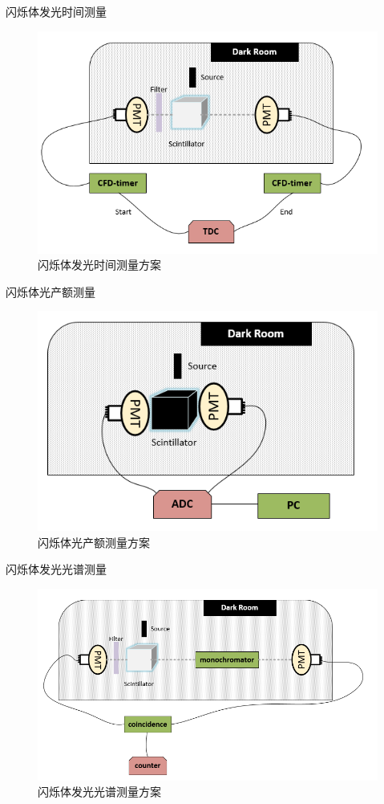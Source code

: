 \documentclass[11pt,compress,xcolor=x11names,UTF8]{beamer}
\begin{document}
\begin{frame}{闪烁体发光时间测量}
\begin{figure}
\centering
\includegraphics[width=.8\textwidth]{k_time} %
\caption{闪烁体发光时间测量方案 }
\end{figure}

\end{frame}
\begin{frame}{闪烁体光产额测量}
\begin{figure}
\centering
\includegraphics[width=.8\textwidth]{k_le} %
\caption{闪烁体光产额测量方案 }
\end{figure}

\end{frame}
\begin{frame}{闪烁体发光光谱测量}
\begin{figure}
\centering
\includegraphics[width=.8\textwidth]{k_ls} %
\caption{闪烁体发光光谱测量方案 }
\end{figure}

\end{frame}
\end{document}
